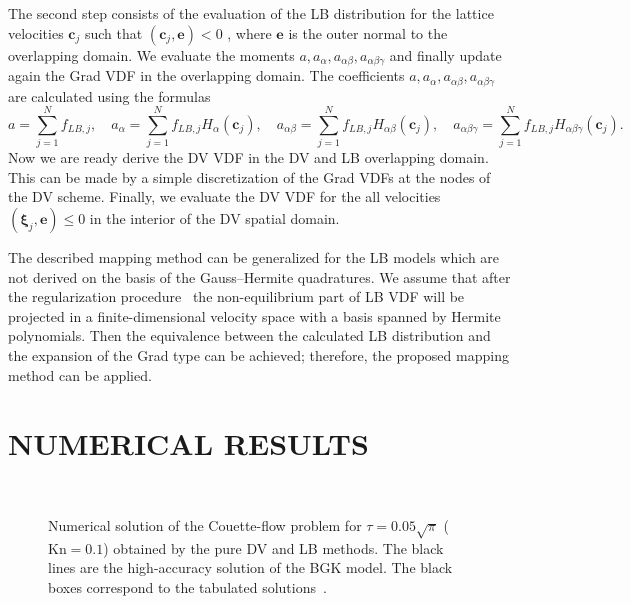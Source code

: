 \documentclass{aip-cp}
\makeatletter
\newenvironment{subfigures}
 {\begin{minipage}{\columnwidth}\def\@captype{figure}\centering}
 {\end{minipage}}
\newcommand{\Kn}{\mathrm{Kn}}
\newcommand{\bxi}{\boldsymbol{\xi}}
\newcommand{\bc}{\boldsymbol{c}}
\makeatother
\begin{document}
The second step consists of the evaluation of the LB   distribution for the lattice velocities $\boldsymbol{c}_j$ such that $(\boldsymbol{c}_j,\mathbf{e})<0$ , where $\mathbf{e}$ is the outer normal to the overlapping domain.  We evaluate the moments $a,a_{\alpha},a_{\alpha\beta},
a_{\alpha\beta\gamma}$ and finally update again the Grad VDF in the overlapping domain. The coefficients $a,a_{\alpha},a_{\alpha\beta},
a_{\alpha\beta\gamma}$ are calculated using the formulas
$$
a=\sum_{j=1}^N f_{LB,j}, \quad a_{\alpha}=\sum_{j=1}^N f_{LB,j}H_{\alpha}(\bc_j), \quad a_{\alpha\beta}=\sum_{j=1}^N f_{LB,j}H_{\alpha\beta}(\bc_j),
\quad a_{\alpha\beta\gamma}=\sum_{j=1}^N f_{LB,j}H_{\alpha\beta\gamma}(\bc_j).
$$
Now we are ready derive the DV VDF in the DV and LB overlapping domain. This can be made by a simple
discretization of the Grad VDFs at the nodes of the DV scheme. Finally, we evaluate the DV VDF for the all velocities $(\bxi_j,\mathbf{e}) \leq 0$
in the interior of the DV spatial domain.

The described mapping method can be generalized for the LB models which are not derived on the basis of the Gauss--Hermite quadratures.
We assume that after the regularization procedure~\cite{Latt2006, Chen2006}
the non-equilibrium part of LB VDF will be projected in a finite-dimensional velocity space with a basis spanned by Hermite polynomials.
Then the equivalence between the calculated LB distribution and
the expansion of the Grad type can be achieved; therefore, the proposed mapping method can be applied.

\section{NUMERICAL RESULTS}\label{sec:results}

\begin{figure}
    \begin{subfigures}
    \centering
    \subfloat[][LB method: D3Q19]{%
        \texttt{[image: d3q19]}}\\
    \subfloat[][LB method: D3Q121]{%
        \texttt{[image: d3q121]}}%
    \subfloat[][LB method: D3Q96]{%
        \texttt{[image: d3v96]}}
    \end{subfigures}
    \caption{
        Numerical solution of the Couette-flow problem for $\tau=0.05\sqrt\pi$ ($\Kn=0.1$) obtained by the pure DV and LB methods.
        The black lines are the high-accuracy solution of the BGK model.
        The black boxes correspond to the tabulated solutions~\cite{Luo2015, Luo2016}.
    }\label{fig:pure}
\end{figure}
\end{document}

